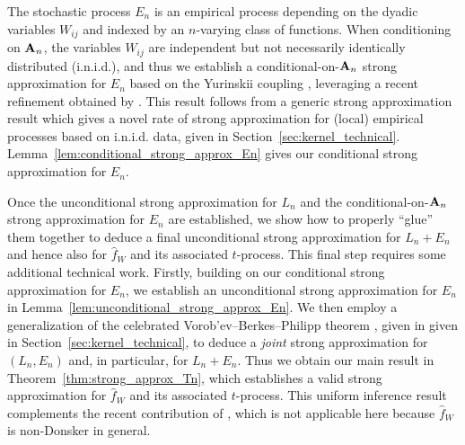 The stochastic process $E_n$ is an empirical process depending on the dyadic
variables $W_{i j}$ and indexed by an $n$-varying class of functions. When
conditioning on $\mathbf{A}_n$, the variables $W_{i j}$ are independent but not
necessarily identically distributed (i.n.i.d.), and thus we establish a
conditional-on-$\mathbf{A}_n$ strong approximation for $E_n$ based on the Yurinskii
coupling \citep{yurinskii1978error}, leveraging a recent refinement obtained by
\citet*[Lemma~38]{belloni2019conditional}. This result follows from a generic
strong approximation result which gives a novel rate of strong approximation
for (local) empirical processes based on i.n.i.d. data, given in
Section~\ref{sec:kernel_technical}.
Lemma~\ref{lem:conditional_strong_approx_En} gives our conditional strong
approximation for $E_n$.

Once the unconditional strong approximation for $L_n$ and the
conditional-on-$\mathbf{A}_n$ strong approximation for $E_n$ are established, we show
how to properly ``glue'' them together to deduce a final unconditional strong
approximation for $L_n+E_n$ and hence also for $\hat{f}_W$ and its associated
$t$-process. This final step requires some additional technical work. Firstly,
building on our conditional strong approximation for $E_n$, we establish an
unconditional strong approximation for $E_n$ in
Lemma~\ref{lem:unconditional_strong_approx_En}. We then employ a generalization
of the celebrated Vorob'ev--Berkes--Philipp theorem \citep{dudley1999uniform},
given in given in Section~\ref{sec:kernel_technical}, to deduce a \emph{joint}
strong approximation for $(L_n,E_n)$ and, in particular, for $L_n+E_n$. Thus we
obtain our main result in Theorem~\ref{thm:strong_approx_Tn}, which establishes
a valid strong approximation for $\hat{f}_W$ and its associated $t$-process.
This uniform inference result complements the recent contribution of
\citet{davezies2021exchangeable}, which is not applicable here because
$\hat{f}_W$ is non-Donsker in general.

